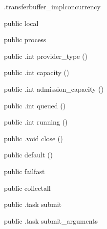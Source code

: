 \begin{CrexxClass}{.transferbuffer\_impl}{concurrency}

  \begin{Hierarchy}
  \end{Hierarchy}

  \begin{Members}

    \Factory
      {public}
      {local}
      {}

    \Factory
      {public}
      {process}
      {}

    \Method
      {public}
      {.int}
      {provider\_type}
      {()}

    \Method
      {public}
      {.int}
      {capacity}
      {()}

    \Method
      {public}
      {.int}
      {admission\_capacity}
      {()}

    \Method
      {public}
      {.int}
      {queued}
      {()}

    \Method
      {public}
      {.int}
      {running}
      {()}

    \Method
      {public}
      {.void}
      {close}
      {()}

    \Factory
      {public}
      {default}
      {()}

    \Factory
      {public}
      {failfast}
      {}

    \Factory
      {public}
      {collectall}
      {}

    \Method
      {public}
      {.task}
      {submit}
      {}

    \Method
      {public}
      {.task}
      {submit\_arguments}
      {}


\end{Members}
\end{CrexxClass}
